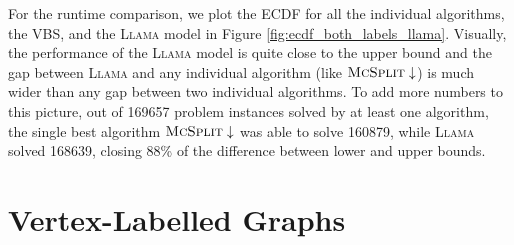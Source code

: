\documentclass{l4proj}
\theoremstyle{definition}
\theoremstyle{remark}
\begin{document}
For the runtime comparison, we plot the ECDF for all the individual algorithms,
the VBS, and the \textsc{Llama} model in Figure
\ref{fig:ecdf_both_labels_llama}. Visually, the performance of the
\textsc{Llama} model is quite close to the upper bound and the gap between
\textsc{Llama} and any individual algorithm (like $\textsc{McSplit}\downarrow$)
is much wider than any gap between two individual algorithms. To add more
numbers to this picture, out of \num{169657} problem instances solved by at
least one algorithm, the single best algorithm $\textsc{McSplit}\downarrow$ was
able to solve \num{160879}, while \textsc{Llama} solved \num{168639}, closing
88\% of the difference between lower and upper bounds.

\section{Vertex-Labelled Graphs}




\end{document}
